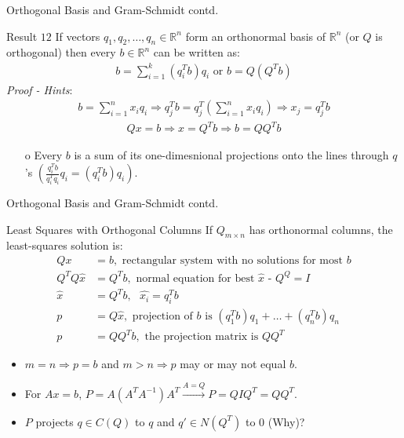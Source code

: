 \documentclass{beamer}
\begin{document}
\begin{frame}{Orthogonal Basis and Gram-Schmidt contd.}
\begin{block}{Result $12$}
If vectors $q_1,q_2,\ldots,q_n \in \mathbb{R}^n$ form an orthonormal basis of $\mathbb{R}^n$ (or $Q$ is orthogonal) then every $b \in \mathbb{R}^n$ can be written as:
\begin{align*}
    b = \sum_{i=1}^{k}(q_i^Tb)q_i \text{ or } b = Q(Q^Tb)
\end{align*}
\textit{Proof - Hints}: 
\begin{align*}
    b = \sum_{i=1}^{n}x_iq_i \Rightarrow q_j^Tb = q_j^T(\sum_{i=1}^{n}x_iq_i) \Rightarrow x_j = q_j^Tb
\end{align*}
\begin{align*}
    Qx = b \Rightarrow x = Q^Tb \Rightarrow b = QQ^Tb
\end{align*}
\begin{itemize}
    \item[o] Every $b$ is a sum of its one-dimesnional projections onto the lines through $q$'s $\left(\frac{q_i^Tb}{q_i^Tq_i}q_i = (q_i^Tb)q_i\right)$.
\end{itemize}
\end{block}
\end{frame}

\begin{frame}{Orthogonal Basis and Gram-Schmidt contd.}
\begin{exampleblock}{Least Squares with Orthogonal Columns}
If $Q_{m\times n}$ has orthonormal columns, the least-squares solution is:
\begin{align*}
    Qx &= b, \text{ rectangular system with no solutions for most $b$}\\
    Q^TQ\hat{x} &= Q^Tb, \text{ normal equation for best $\hat{x}$ - $Q^Q = I$}\\
    \hat{x} &= Q^Tb, \text{ $\hat{x_i} = q_i^Tb$}\\
    p &= Q\hat{x}, \text{ projection of $b$ is $(q_1^Tb)q_1+\ldots+(q_n^Tb)q_n$}\\
    p &= QQ^Tb, \text{ the projection matrix is $QQ^T$}
\end{align*}
\end{exampleblock}
\begin{itemize}
    \item $m=n \Rightarrow p=b$ and $m>n \Rightarrow p$ may or may not equal $b$.
    \item For $Ax=b$, $P = A(A^TA^{-1})A^T \xrightarrow{A=Q} P = QIQ^T=QQ^T$.
    \item $P$ projects $q \in C(Q)$ to $q$ and $q' \in N(Q^T)$ to $0$ (Why)?
\end{itemize}
\end{frame}
\end{document}
